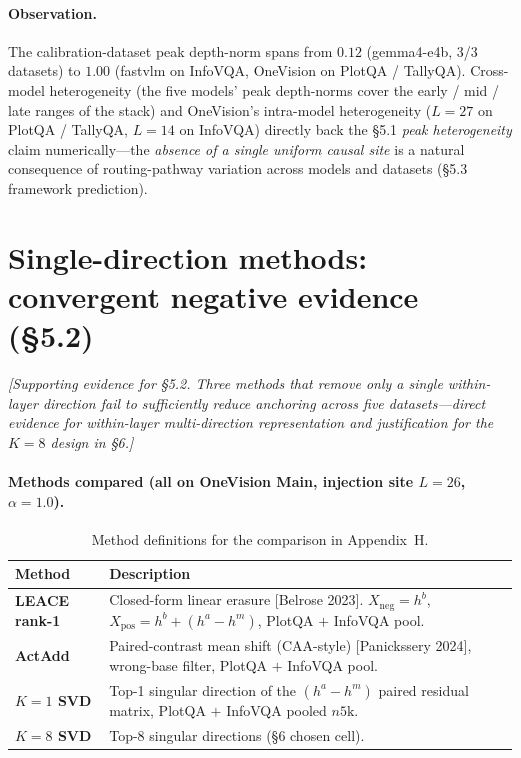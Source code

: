 \documentclass[11pt]{article}
\newcommand{\todoNote}[1]{\textit{\textcolor[rgb]{0.45,0.45,0.45}{[#1]}}}
\begin{document}
\paragraph{Observation.} The calibration-dataset peak depth-norm spans from $0.12$ (gemma4-e4b, 3/3 datasets) to $1.00$ (fastvlm on InfoVQA, OneVision on PlotQA / TallyQA). Cross-model heterogeneity (the five models' peak depth-norms cover the early / mid / late ranges of the stack) and OneVision's intra-model heterogeneity ($L=27$ on PlotQA / TallyQA, $L=14$ on InfoVQA) directly back the \S5.1 \textit{peak heterogeneity} claim numerically---the \textit{absence of a single uniform causal site} is a natural consequence of routing-pathway variation across models and datasets (\S5.3 framework prediction).

\section{Single-direction methods: convergent negative evidence (\S5.2)}
\label{app:single-direction}

\todoNote{Supporting evidence for \S5.2. Three methods that remove only a single within-layer direction fail to sufficiently reduce anchoring across five datasets---direct evidence for \textit{within-layer multi-direction representation} and justification for the $K=8$ design in \S6.}

\paragraph{Methods compared (all on OneVision Main, injection site $L=26$, $\alpha=1.0$).}

\begin{table}[h]
  \centering
  \small
  \begin{tabular}{p{1.8cm} p{4.4cm}}
    \toprule
    \textbf{Method} & \textbf{Description} \\
    \midrule
    \textbf{LEACE rank-1} & Closed-form linear erasure [Belrose 2023]. $X_\text{neg} = h^b$, $X_\text{pos} = h^b + (h^a - h^m)$, PlotQA $+$ InfoVQA pool. \\
    \textbf{ActAdd} & Paired-contrast mean shift (CAA-style) [Panickssery 2024], wrong-base filter, PlotQA $+$ InfoVQA pool. \\
    \textbf{$K{=}1$ SVD} & Top-1 singular direction of the $(h^a - h^m)$ paired residual matrix, PlotQA $+$ InfoVQA pooled $n5\text{k}$. \\
    \textbf{$K{=}8$ SVD} & Top-8 singular directions (\S6 chosen cell). \\
    \bottomrule
  \end{tabular}
  \caption{Method definitions for the comparison in Appendix~H.}
  \label{tab:single-direction-methods}
\end{table}
\end{document}
